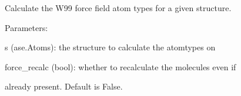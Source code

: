 \documentclass[letterpaper,10pt,english]{sphinxmanual}
\begin{document}
\begin{fulllineitems}
\label{doctree/soprano.calculate.gulp.w99:soprano.calculate.gulp.w99.find_w99_atomtypes}
Calculate the W99 force field atom types for a given structure.

\begin{DUlineblock}{0em}
\item[] Parameters:
\item[]
\begin{DUlineblock}{\DUlineblockindent}
\item[] s (ase.Atoms): the structure to calculate the atomtypes on
\item[] force\_recalc (bool): whether to recalculate the molecules even if
\item[]
\begin{DUlineblock}{\DUlineblockindent}
\item[] already present. Default is False.
\end{DUlineblock}
\end{DUlineblock}
\end{DUlineblock}

\end{fulllineitems}

\end{document}

